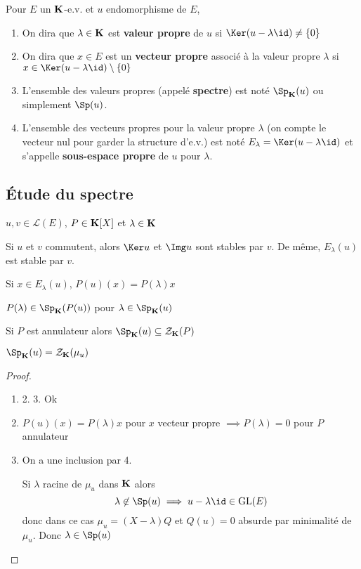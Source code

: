 \begin{dfn}
    Pour $E$ un $\mathbf K$-e.v. et $u$ endomorphisme de $E$, \begin{enumerate}
        \item On dira que $\lambda\in\mathbf K$ est \textbf{valeur propre} de $u$ si $\Ker(u-\lambda\id)\neq \{0\}$
        \item On dira que $x\in E$ est un \textbf{vecteur propre} associé à la valeur propre $\lambda$ si $x\in\Ker(u-\lambda\id)\setminus\{0\}$
        \item L'ensemble des valeurs propres (appelé \textbf{spectre}) est noté $\Sp_{\K}(u)$ ou simplement $\Sp(u)$.
        \item L'ensemble des vecteurs propres pour la valeur propre $\lambda$ (on compte le vecteur nul pour garder la structure d'e.v.) est noté $E_\lambda=\Ker(u-\lambda \id)$ et s'appelle \textbf{sous-espace propre} de $u$ pour $\lambda$.
    \end{enumerate}
\end{dfn}

\subsection{Étude du spectre}

\begin{prop}
    \Hyp $u, v\in\mathcal L(E)$, $P\in\mathbf K[X]$ et $\lambda\in\mathbf K$
    \begin{concenum}
    \item Si $u$ et $v$ commutent, alors $\Ker u$ et $\Img u$ sont stables par $v$. De même, $E_\lambda(u)$ est stable par $v$.
    \item Si $x\in E_\lambda(u)$, $P(u)(x)=P(\lambda)x$
    \item $P(\lambda)\in\Sp_{\K}(P(u))$ pour $\lambda\in \Sp_{\K}(u)$
    \item Si $P$ est annulateur alors $\Sp_{\K}(u)\subseteq \mathcal Z_{\K}(P)$
    \item $\Sp_{\K}(u)=\mathcal Z_{\K}(\mu_u)$
    \end{concenum}
\end{prop}

\begin{proof}~ \begin{enumerate}
    \item 2. 3. Ok
    \setcounter{enumi}{3}
    \item $P(u)(x)=P(\lambda)x$ pour $x$ vecteur propre $\implies P(\lambda) = 0$ pour $P$ annulateur
    \item On a une inclusion par 4.

        Si $\lambda$ racine de $\mu_u$ dans $\mathbf K$ alors \[ \lambda \not\in\Sp(u)\implies u-\lambda\id \in \mathrm{GL}(E)
        \]
        donc dans ce cas $\mu_u=(X-\lambda) Q$ et $Q(u)=0$ absurde par minimalité de $\mu_u$. Donc $\lambda\in\Sp(u)$
\end{enumerate}
\end{proof}

